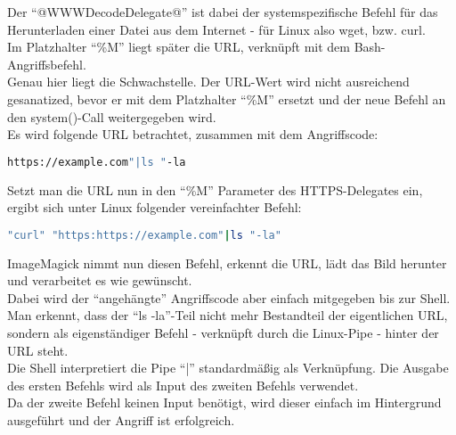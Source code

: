 Der "`@WWWDecodeDelegate@"' ist dabei der systemspezifische Befehl für das Herunterladen einer Datei aus dem Internet - für Linux also wget, bzw. curl.\\
Im Platzhalter "`\%M"' liegt später die URL, verknüpft mit dem Bash-Angriffsbefehl.\\

\newpage
Genau hier liegt die Schwachstelle.
Der URL-Wert wird nicht ausreichend gesanatized,
bevor er mit dem Platzhalter "`\%M"' ersetzt und der neue Befehl an den system()-Call weitergegeben wird.\\

Es wird folgende URL betrachtet, zusammen mit dem Angriffscode:

\begin{lstlisting}[firstnumber=91, language=Bash, caption=Beispielhafte URL mit Angriffscode,label={lst:lstlisting}]
https://example.com"|ls "-la
\end{lstlisting}
\vspace{5mm}

Setzt man die URL nun in den "`\%M"' Parameter des HTTPS-Delegates ein, ergibt sich unter Linux folgender vereinfachter Befehl:

\begin{lstlisting}[language=Bash, caption=HTTPS Delegate mit Angriffscode,label={lst:angriffscodedelegate}]
"curl" "https:https://example.com"|ls "-la"
\end{lstlisting}
\vspace{5mm}

ImageMagick nimmt nun diesen Befehl, erkennt die URL, lädt das Bild herunter und verarbeitet es wie gewünscht.\\

Dabei wird der "`angehängte"' Angriffscode aber einfach mitgegeben bis zur Shell.
Man erkennt, dass der "`ls -la"'-Teil nicht mehr Bestandteil der eigentlichen URL,
sondern als eigenständiger Befehl - verknüpft durch die Linux-Pipe - hinter der URL steht.\\

Die Shell interpretiert die Pipe "`|"' standardmäßig als Verknüpfung.
Die Ausgabe des ersten Befehls wird als Input des zweiten Befehls verwendet.\\
Da der zweite Befehl keinen Input benötigt, wird dieser einfach im Hintergrund ausgeführt und der Angriff ist erfolgreich.\\
